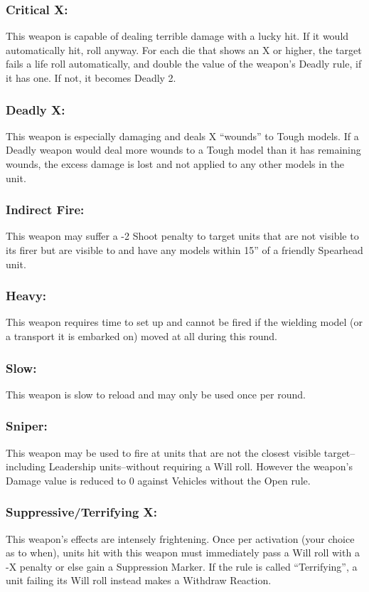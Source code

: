 \begin{multicols}{2}
\subsubsection*{Critical X:} This weapon is capable of dealing terrible damage with a lucky hit. If it would automatically hit, roll anyway. For each die that shows an X or higher, the target fails a life roll automatically, and double the value of the weapon's Deadly rule, if it has one. If not, it becomes Deadly 2.

\subsubsection*{Deadly X:} This weapon is especially damaging and deals X ``wounds'' to Tough models. If a Deadly weapon would deal more wounds to a Tough model than it has remaining wounds, the excess damage is lost and not applied to any other models in the unit.

\subsubsection*{Indirect Fire:} This weapon may suffer a -2 Shoot penalty to target units that are not visible to its firer but are visible to and have any models within 15'' of a friendly Spearhead unit.

\subsubsection*{Heavy:} This weapon requires time to set up and cannot be fired if the wielding model (or a transport it is embarked on) moved at all during this round.

\subsubsection*{Slow:} This weapon is slow to reload and may only be used once per round.

\subsubsection*{Sniper:} This weapon may be used to fire at units that are not the closest visible target--including Leadership units--without requiring a Will roll. However the weapon's Damage value is reduced to 0 against Vehicles without the Open rule.

\subsubsection*{Suppressive/Terrifying X:} This weapon's effects are intensely frightening. Once per activation (your choice as to when), units hit with this weapon must immediately pass a Will roll with a -X penalty or else gain a Suppression Marker. If the rule is called ``Terrifying'', a unit failing its Will roll instead makes a Withdraw Reaction.


\end{multicols}
